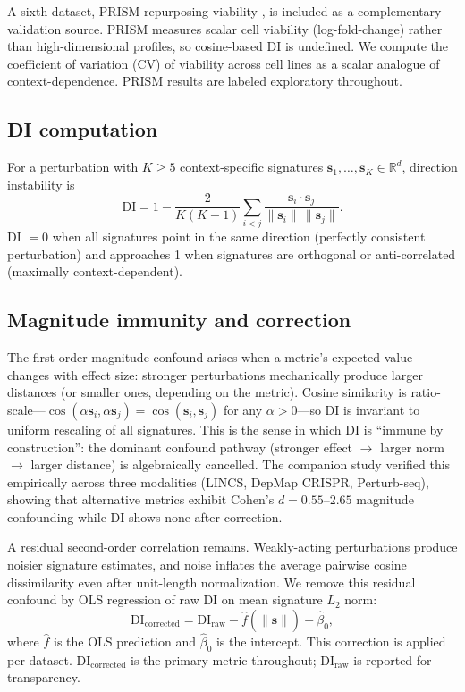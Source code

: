 \documentclass[11pt]{article}
\begin{document}
A sixth dataset, PRISM repurposing viability \citep{corsello2020prism},
is included as a complementary validation source.  PRISM measures scalar
cell viability (log-fold-change) rather than high-dimensional profiles,
so cosine-based DI is undefined.  We compute the coefficient of
variation (CV) of viability across cell lines as a scalar analogue of
context-dependence.  PRISM results are labeled exploratory throughout.

\subsection{DI computation}

For a perturbation with $K \geq 5$ context-specific signatures
$\mathbf{s}_1, \ldots, \mathbf{s}_K \in \mathbb{R}^d$, direction
instability is
\begin{equation}
\mathrm{DI} = 1 - \frac{2}{K(K-1)} \sum_{i < j}
\frac{\mathbf{s}_i \cdot \mathbf{s}_j}
     {\|\mathbf{s}_i\| \, \|\mathbf{s}_j\|}.
\label{eq:di}
\end{equation}
DI $= 0$ when all signatures point in the same direction (perfectly
consistent perturbation) and approaches 1 when signatures are
orthogonal or anti-correlated (maximally context-dependent).

\subsection{Magnitude immunity and correction}

The first-order magnitude confound arises when a metric's expected value
changes with effect size: stronger perturbations mechanically produce
larger distances (or smaller ones, depending on the metric).  Cosine
similarity is ratio-scale---$\cos(\alpha \mathbf{s}_i,
\alpha \mathbf{s}_j) = \cos(\mathbf{s}_i, \mathbf{s}_j)$ for any
$\alpha > 0$---so DI is invariant to uniform rescaling of all
signatures.  This is the sense in which DI is ``immune by
construction'': the dominant confound pathway (stronger effect
$\to$ larger norm $\to$ larger distance) is algebraically cancelled.
The companion study \citep{tower2026confound} verified this empirically
across three modalities (LINCS, DepMap CRISPR, Perturb-seq), showing
that alternative metrics exhibit Cohen's $d = 0.55$--$2.65$ magnitude
confounding while DI shows none after correction.

A residual second-order correlation remains.  Weakly-acting
perturbations produce noisier signature estimates, and noise inflates
the average pairwise cosine dissimilarity even after unit-length
normalization.  We remove this residual confound by OLS regression of
raw DI on mean signature $L_2$ norm:
\begin{equation}
\mathrm{DI}_{\mathrm{corrected}} = \mathrm{DI}_{\mathrm{raw}}
  - \hat{f}(\overline{\|\mathbf{s}\|}) + \hat{\beta}_0,
\label{eq:magnitude}
\end{equation}
where $\hat{f}$ is the OLS prediction and $\hat{\beta}_0$ is the
intercept.  This correction is applied per dataset.
$\mathrm{DI}_{\mathrm{corrected}}$ is the primary metric throughout;
$\mathrm{DI}_{\mathrm{raw}}$ is reported for transparency.
\end{document}
